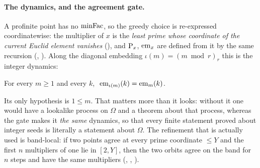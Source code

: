 \paragraph{The dynamics, and the agreement gate.}
A profinite point has no $\mathrm{minFac}$, so the greedy choice is re-expressed
coordinatewise: the multiplier of $x$ is the \emph{least prime whose
coordinate of the current Euclid element vanishes}
(), and
$\mathrm{P}_{x}$, $\mathrm{em}_{x}$ are defined from it by the same recursion
(,
).  Along the diagonal
embedding $\iota(m) = (m \bmod r)_r$ this is the integer dynamics:

\begin{theorem}
\label{thm:profinite-gate}
For every $m \geq 1$ and every $k$, $\ \mathrm{em}_{\iota(m)}(k) = \mathrm{em}_{m}(k)$.
\end{theorem}

\noindent Its only hypothesis is $1 \leq m$.  That matters more than it
looks: without it one would have a lookalike process on $\Omega$ and a
theorem about that process, whereas the gate makes it \emph{the same}
dynamics, so that every finite statement proved about integer seeds is
literally a statement about $\Omega$.  The refinement that is actually
used is band-local: if two points agree at every prime coordinate $\le Y$
and the first $n$ multipliers of one lie in $[2,Y]$, then the two orbits
agree on the band for $n$ steps and have the same multipliers
(,
,
).

